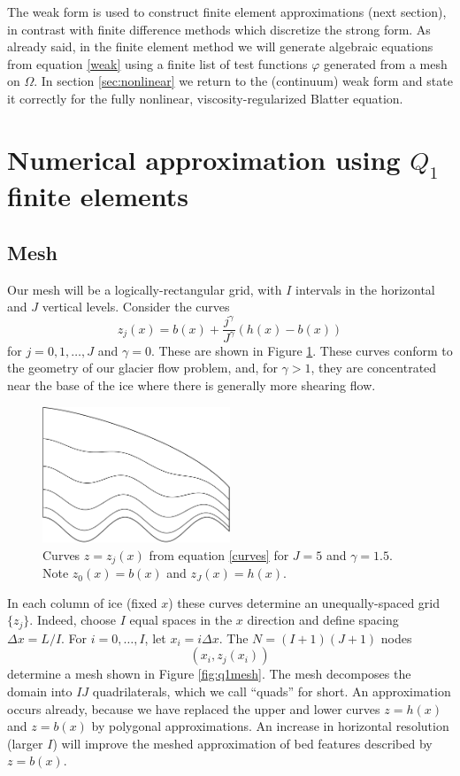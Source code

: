 \documentclass[11pt,final,reqno]{amsart}
\theoremstyle{remark}
\theoremstyle{definition}
\begin{document}
The weak form is used to construct finite element approximations (next section), in contrast with finite difference methods which discretize the strong form.  As already said, in the finite element method we will generate algebraic equations from equation \eqref{weak} using a finite list of test functions $\varphi$ generated from a mesh on $\Omega$.  In section \ref{sec:nonlinear} we return to the (continuum) weak form and state it correctly for the fully nonlinear, viscosity-regularized Blatter equation.


\newpage
\section{Numerical approximation using \texorpdfstring{$Q_1$}{Q\textonesuperior} finite elements}\label{sec:fem}  %

\subsection*{Mesh}   Our mesh will be a logically-rectangular grid, with $I$ intervals in the horizontal and $J$ vertical levels.  Consider the curves
\begin{equation}
	z_j(x) = b(x) + \frac{j^\gamma}{J^\gamma} (h(x) - b(x)) \label{curves}
\end{equation}
for $j=0,1,\dots,J$ and $\gamma=0$.  These are shown in Figure \ref{fig:conform}.  These curves conform to the geometry of our glacier flow problem, and, for $\gamma>1$, they are concentrated near the base of the ice where there is generally more shearing flow.

\begin{figure}[ht] 
\includegraphics[width=0.5\textwidth]{figs/conform}
\caption{Curves $z=z_j(x)$ from equation \eqref{curves} for $J=5$ and $\gamma=1.5$.  Note $z_0(x)=b(x)$ and $z_J(x)=h(x)$.}
\label{fig:conform}
\end{figure}

In each column of ice (fixed $x$) these curves determine an unequally-spaced grid $\{z_j\}$.  Indeed, choose $I$ equal spaces in the $x$ direction and define spacing $\Delta x=L/I$.  For $i=0,\dots,I$, let $x_i = i \Delta x$.  The $N = (I+1)(J+1)$ nodes 
	$$(x_i,z_j(x_i))$$
determine a mesh shown in Figure \ref{fig:q1mesh}.  The mesh decomposes the domain into $I J$ quadrilaterals, which we call ``quads'' for short.  An approximation occurs already, because we have replaced the upper and lower curves $z=h(x)$ and $z=b(x)$ by polygonal approximations.  An increase in horizontal resolution (larger $I$) will improve the meshed approximation of bed features described by $z=b(x)$.
 
\end{document}
